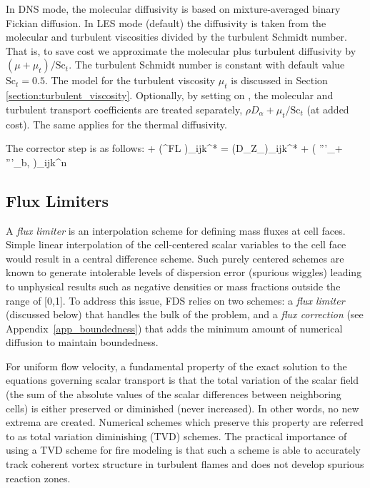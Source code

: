 In DNS mode, the molecular diffusivity is based on mixture-averaged binary Fickian diffusion.  In LES mode (default) the diffusivity is taken from the molecular and turbulent viscosities divided by the turbulent Schmidt number.  That is, to save cost we approximate the molecular plus turbulent diffusivity by $(\mu + \mu_t)/\mbox{Sc}_t$.   The turbulent Schmidt number is constant with default value $\mbox{Sc}_t = 0.5$.  The model for the turbulent viscosity $\mu_t$ is discussed in Section \ref{section:turbulent_viscosity}.  Optionally, by setting  on , the molecular and turbulent transport coefficients are treated separately, $\rho D_\alpha + \mu_t/\mbox{Sc}_t$ (at added cost).  The same applies for the thermal diffusivity.

The corrector step is as follows:
\be {} {\ha \dt}
    + \nabla\!\cdot(^{\rm FL} )_{ijk}^*
    = \nabla\!\cdot (\rho D_\alpha \nabla Z_\alpha)_{ijk}^{*} + \left( '''_\alpha + '''_{\rm b,\alpha} \right)_{ijk}^n
\ee


\subsection{Flux Limiters}
\label{sec_flux_limiters}

A \emph{flux limiter} is an interpolation scheme for defining mass fluxes at cell faces. Simple linear interpolation of the cell-centered scalar variables to the cell face would result in a central difference scheme.  Such purely centered schemes are known to generate intolerable levels of dispersion error (spurious wiggles) leading to unphysical results such as negative densities or mass fractions outside the range of [0,1].  To address this issue, FDS relies on two schemes: a \emph{flux limiter} (discussed below) that handles the bulk of the problem, and a \emph{flux correction} (see Appendix~\ref{app_boundedness}) that adds the minimum amount of numerical diffusion to maintain boundedness.

For uniform flow velocity, a fundamental property of the exact solution to the equations governing scalar transport is that the total variation of the scalar field (the sum of the absolute values of the scalar differences between neighboring cells) is either preserved or diminished (never increased).  In other words, no new extrema are created.  Numerical schemes which preserve this property are referred to as total variation diminishing (TVD) schemes.  The practical importance of using a TVD scheme for fire modeling is that such a scheme is able to accurately track coherent vortex structure in turbulent flames and does not develop spurious reaction zones.

